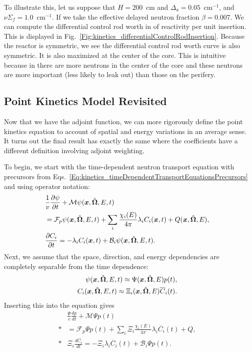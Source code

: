 To illustrate this, let us suppose that $H = 200$~cm and $\Delta_a = 0.05$~cm$^{-1}$, and $\nu\Sigma_f = 1.0$~cm$^{-1}$. If we take the effective delayed neutron fraction $\beta = 0.007$. We can compute the differential control rod worth in \textcent of reactivity per unit insertion. This is displayed in Fig.~\ref{Fig:kinetics_differentialControlRodInsertion}. Because the reactor is symmetric, we see the differential control rod worth curve is also symmetric. It is also maximized at the center of the core. This is intuitive because in there are more neutrons in the center of the core and these neutrons are more important (less likely to leak out) than those on the perifery.

\subsection{Point Kinetics Model Revisited}

Now that we have the adjoint function, we can more rigorously define the point kinetics equation to account of spatial and energy variations in an average sense. It turns out the final result has exactly the same where the coefficients have a different definition involving adjoint weighting.

To begin, we start with the time-dependent neutron transport equation with precursors from Eqs.~\eqref{Eq:kinetics_timeDependentTransportEquationsPrecursors} and using operator notation:
\begin{align}
  &\frac{1}{v}\frac{ \partial {\psi} }{ \partial {t} } + \mathcal{M} \psi(\bm{x},\hat{\mathbf{\Omega}},E,t) \nonumber \\*
  &= \mathcal{F}_p \psi(\bm{x},\hat{\mathbf{\Omega}},E,t) + \sum_i \frac{\chi_i(E)}{4\pi} \lambda_i C_i(\bm{x},t) + Q(\bm{x},\hat{\mathbf{\Omega}},E) , \nonumber \\*
  &\frac{ \partial {C_i} }{ \partial {t} } = - \lambda_i C_i(\bm{x},t) + \mathcal{B}_i \psi(\bm{x},\hat{\mathbf{\Omega}},E,t) . \nonumber
\end{align}
Next, we assume that the space, direction, and energy dependencies are completely separable from the time dependence:
\begin{subequations}
\begin{align}
  \psi(\bm{x},\hat{\mathbf{\Omega}},E,t) \approx \Psi(\bm{x},\hat{\mathbf{\Omega}},E) p(t), \\
  C_i(\bm{x},\hat{\mathbf{\Omega}},E,t) \approx \Xi_i(\bm{x},\hat{\mathbf{\Omega}},E) \overline{C}_i(t). 
\end{align}
\end{subequations}
Inserting this into the equation gives
\begin{subequations}
\begin{align}
  &\frac{\Psi}{v}\frac{dp}{dt}  +   \mathcal{M} \Psi p(t) \nonumber \\*
  &= \mathcal{F}_p \Psi p(t)  + \sum_i \Xi_i \frac{\chi_i(E)}{4\pi} \lambda_i \overline{C}_i(t) + Q ,  \label{Eq:kinetics_pointKineticsDerivationAdjoint_NeutronBalance_step0} \\*
  &\Xi_i \frac{ d\overline{C}_i}{dt} = - \Xi_i  \lambda_i \overline{C}_i(t) +  \mathcal{B}_i \Psi p(t). \label{Eq:kinetics_pointKineticsDerivationAdjoint_PrecursorBalance_step0}
\end{align}
\end{subequations}

